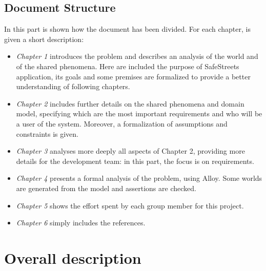 \documentclass{article}
\begin{document}
		\subsection{Document Structure}
			In this part is shown how the document has been divided. For each chapter, is given a short description:
			\begin{itemize}
				\item \textit{Chapter 1} introduces the problem and describes an analysis of the world and of the shared phenomena. Here are included the purpose of SafeStreets application, its goals and some premises are formalized to provide a better understanding of following chapters.
				\item \textit{Chapter 2} includes further details on the shared phenomena and domain model, specifying which are the most important requirements and who will be a user of the system. Moreover, a formalization of assumptions and constraints is given.
				\item \textit{Chapter 3} analyses more deeply all aspects of Chapter 2, providing more details for the development team: in this part, the focus is on requirements.
				\item \textit{Chapter 4} presents a formal analysis of the problem, using Alloy. Some worlds are generated from the model and assertions are checked.
				\item \textit{Chapter 5} shows the effort spent by each group member for this project.
				\item \textit{Chapter 6} simply includes the references.
			\end{itemize}
	
	\newpage










	\section{Overall description}
\end{document}
